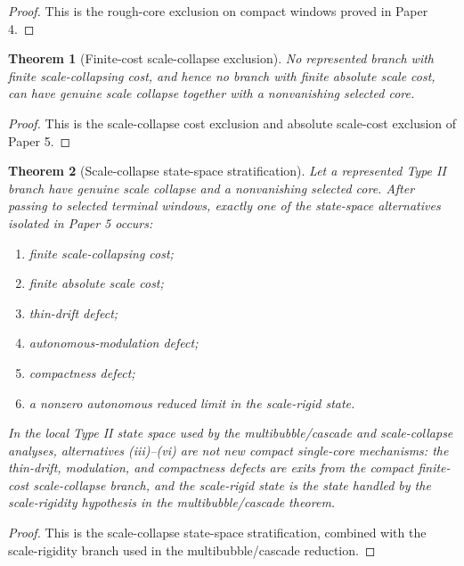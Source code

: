 \documentclass[11pt]{amsart}
\theoremstyle{plain}
\newtheorem{theorem}{Theorem}[section]
\theoremstyle{definition}
\theoremstyle{remark}
\begin{document}
\begin{proof}
This is the rough-core exclusion on compact windows proved in Paper 4.
\end{proof}

\begin{theorem}[Finite-cost scale-collapse exclusion]
\label{thm:scale-cost}
No represented branch with finite scale-collapsing cost, and hence no branch
with finite absolute scale cost, can have genuine scale collapse together with a
nonvanishing selected core.
\end{theorem}

\begin{proof}
This is the scale-collapse cost exclusion and absolute scale-cost exclusion of
Paper 5.
\end{proof}

\begin{theorem}[Scale-collapse state-space stratification]
\label{thm:scale-stratification}
Let a represented Type II branch have genuine scale collapse and a nonvanishing
selected core.  After passing to selected terminal windows, exactly one of the
state-space alternatives isolated in Paper 5 occurs:
\begin{enumerate}[label=\textup{(\roman*)}]
\item finite scale-collapsing cost;
\item finite absolute scale cost;
\item thin-drift defect;
\item autonomous-modulation defect;
\item compactness defect;
\item a nonzero autonomous reduced limit in the scale-rigid state.
\end{enumerate}
In the local Type II state space used by the multibubble/cascade and
scale-collapse analyses, alternatives
\textup{(iii)}--\textup{(vi)} are not new compact single-core mechanisms: the
thin-drift, modulation, and compactness defects are exits from the compact
finite-cost scale-collapse branch, and the scale-rigid state is the state
handled by the scale-rigidity hypothesis in the multibubble/cascade theorem.
\end{theorem}

\begin{proof}
This is the scale-collapse state-space stratification, combined with the
scale-rigidity branch used in the multibubble/cascade reduction.
\end{proof}
\end{document}
